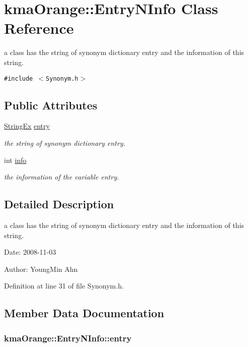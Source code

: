 \hypertarget{classkmaOrange_1_1EntryNInfo}{
\section{kmaOrange::EntryNInfo Class Reference}
\label{classkmaOrange_1_1EntryNInfo}
}
a class has the string of synonym dictionary entry and the information of this string.  


{\tt \#include $<$Synonym.h$>$}

\subsection*{Public Attributes}
\begin{CompactItemize}
\item 
\hyperlink{classStringEx}{StringEx} \hyperlink{classkmaOrange_1_1EntryNInfo_b049dae34892f144ff14b20fb8ca12e2}{entry}
\begin{CompactList}\small\item\em the string of synonym dictionary entry. \item\end{CompactList}\item 
int \hyperlink{classkmaOrange_1_1EntryNInfo_89c4318b80caf33b7d7acda2ad3bd01e}{info}
\begin{CompactList}\small\item\em the information of the variable entry. \item\end{CompactList}\end{CompactItemize}


\subsection{Detailed Description}
a class has the string of synonym dictionary entry and the information of this string. 

\begin{Desc}
\item[Date:]2008-11-03 \end{Desc}
\begin{Desc}
\item[Author:]YoungMin Ahn \end{Desc}


Definition at line 31 of file Synonym.h.

\subsection{Member Data Documentation}
\hypertarget{classkmaOrange_1_1EntryNInfo_b049dae34892f144ff14b20fb8ca12e2}{
\subsubsection[{entry}]{ {\bf kmaOrange::EntryNInfo::entry}}}
\label{classkmaOrange_1_1EntryNInfo_b049dae34892f144ff14b20fb8ca12e2}


